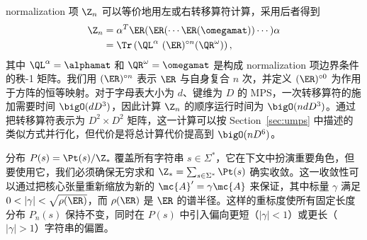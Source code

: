 normalization 项 $\Z_n$ 可以等价地用左或右转移算符计算，采用后者得到
%
\begin{align}
\label{eq:normalization}
\Z_n &= \alpha^T \ER(\ER(\cdots\ER(\omegamat))\cdots) \alpha \nonumber\\
         &= \Tr\left( \QL^\alpha\ (\ER)^{\circ n}(\QR^\omega) \right),
\end{align}
%
其中 $\QL^\alpha = \alphamat$ 和 $\QR^\omega = \omegamat$ 是构成 normalization 项边界条件的秩-1 矩阵。我们用 $(\ER)^{\circ n}$ 表示 $\ER$ 与自身复合 $n$ 次，并定义 $(\ER)^{\circ 0}$ 为作用于方阵的恒等映射。对于字母表大小为 $d$、键维为 $D$ 的 MPS，一次转移算符的施加需要时间 $\bigO(dD^3)$，因此计算 $\Z_n$ 的顺序运行时间为 $\bigO(ndD^3)$。通过把转移算符表示为 $D^2 \times D^2$ 矩阵，这一计算可以按 Section~\ref{sec:umps} 中描述的类似方式并行化，但代价是将总计算代价提高到 $\bigO(nD^6)$。

分布 $P(s) = \Pt(s) / \Z_*$ 覆盖所有字符串 $s\in\Sigma^*$，它在下文中扮演重要角色，但要使用它，我们必须确保无穷求和 $\Z_* = \sum_{s\in\Sigma^*} \Pt(s)$ 确实收敛。这一收敛性可以通过把核心张量重新缩放为新的 $\mc{A}' = \gamma \mc{A}$ 来保证，其中标量 $\gamma$ 满足 $0 < |\gamma| < \sqrt{\rho(\ER)}$，而 $\rho(\ER)$ 是 $\ER$ 的谱半径。这样的重标度使所有固定长度分布 $P_n(s)$ 保持不变，同时在 $P(s)$ 中引入偏向更短（$|\gamma| < 1$）或更长（$|\gamma| > 1$）字符串的偏置。

